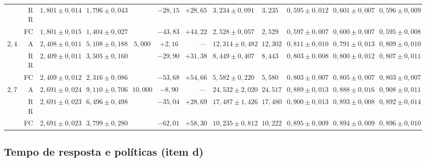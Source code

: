 \documentclass[conference,a4paper]{IEEEtran}
\begin{document}
\begin{table}[t]
\begin{tabular}{@{}rrllrrrlllll@{}}
        & RR & $1{,}801\pm0{,}014$ & $1{,}796\pm0{,}043$ &  & $-28{,}15$ & $+28{,}65$ & $3{,}234\pm0{,}091$ & $3{,}235$ & $0{,}595\pm0{,}012$ & $0{,}601\pm0{,}007$ & $0{,}596\pm0{,}009$ \\
        & FC & $1{,}801\pm0{,}015$ & $1{,}404\pm0{,}027$ &  & $-43{,}83$ & $+44{,}22$ & $2{,}528\pm0{,}057$ & $2{,}529$ & $0{,}597\pm0{,}007$ & $0{,}600\pm0{,}007$ & $0{,}595\pm0{,}008$ \\
$2{,}4$ & A  & $2{,}408\pm0{,}011$ & $5{,}108\pm0{,}188$ & $5{,}000$ & $+2{,}16$ & --- & $12{,}314\pm0{,}482$ & $12{,}302$ & $0{,}811\pm0{,}010$ & $0{,}791\pm0{,}013$ & $0{,}809\pm0{,}010$ \\
        & RR & $2{,}409\pm0{,}011$ & $3{,}505\pm0{,}160$ &  & $-29{,}90$ & $+31{,}38$ & $8{,}449\pm0{,}407$ & $8{,}443$ & $0{,}803\pm0{,}008$ & $0{,}800\pm0{,}012$ & $0{,}807\pm0{,}011$ \\
        & FC & $2{,}409\pm0{,}012$ & $2{,}316\pm0{,}086$ &  & $-53{,}68$ & $+54{,}66$ & $5{,}582\pm0{,}220$ & $5{,}580$ & $0{,}803\pm0{,}007$ & $0{,}805\pm0{,}007$ & $0{,}803\pm0{,}007$ \\
$2{,}7$ & A  & $2{,}691\pm0{,}024$ & $9{,}110\pm0{,}706$ & $10{,}000$ & $-8{,}90$ & --- & $24{,}532\pm2{,}020$ & $24{,}517$ & $0{,}889\pm0{,}013$ & $0{,}888\pm0{,}016$ & $0{,}908\pm0{,}011$ \\
        & RR & $2{,}691\pm0{,}023$ & $6{,}496\pm0{,}498$ &  & $-35{,}04$ & $+28{,}69$ & $17{,}487\pm1{,}426$ & $17{,}480$ & $0{,}900\pm0{,}013$ & $0{,}893\pm0{,}008$ & $0{,}892\pm0{,}014$ \\
        & FC & $2{,}691\pm0{,}023$ & $3{,}799\pm0{,}280$ &  & $-62{,}01$ & $+58{,}30$ & $10{,}235\pm0{,}812$ & $10{,}222$ & $0{,}895\pm0{,}009$ & $0{,}894\pm0{,}009$ & $0{,}896\pm0{,}010$ \\
\bottomrule
\end{tabular}
\end{table}

\subsection{Tempo de resposta e políticas (item d)}
\end{document}
